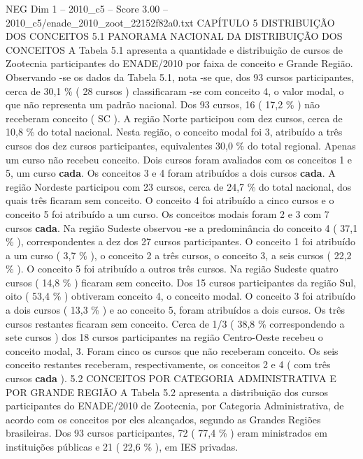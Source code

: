 \begin{textsample}{NEG Dim 1 – 2010\_c5 – Score 3.00 – 2010\_c5/enade\_2010\_zoot\_22152f82a0.txt}  \label{ex:f1_neg_306}
CAPÍTULO 5 DISTRIBUIÇÃO DOS CONCEITOS 5.1 PANORAMA NACIONAL DA DISTRIBUIÇÃO DOS CONCEITOS A Tabela 5.1 apresenta a quantidade e distribuição de cursos de Zootecnia participantes do ENADE/2010 por faixa de conceito e Grande Região.
Observando -se os dados da Tabela 5.1, nota -se que, dos 93 cursos participantes, cerca de 30,1 \% ( 28 cursos ) classificaram -se com conceito 4, o valor modal, o que não representa um padrão nacional.
Dos 93 cursos, 16 ( 17,2 \% ) não receberam conceito ( SC ).
A região Norte participou com dez cursos, cerca de 10,8 \% do total nacional.
Nesta região, o conceito modal foi 3, atribuído a três cursos dos dez cursos participantes, equivalentes 30,0 \% do total regional.
Apenas um curso não recebeu conceito.
Dois cursos foram avaliados com os conceitos 1 e 5, um curso \textbf{cada}.
Os conceitos 3 e 4 foram atribuídos a dois cursos \textbf{cada}.
A região Nordeste participou com 23 cursos, cerca de 24,7 \% do total nacional, dos quais três ficaram sem conceito.
O conceito 4 foi atribuído a cinco cursos e o conceito 5 foi atribuído a um curso.
Os conceitos modais foram 2 e 3 com 7 cursos \textbf{cada}.
Na região Sudeste observou -se a predominância do conceito 4 ( 37,1 \% ), correspondentes a dez dos 27 cursos participantes.
O conceito 1 foi atribuído a um curso ( 3,7 \% ), o conceito 2 a três cursos, o conceito 3, a seis cursos ( 22,2 \% ).
O conceito 5 foi atribuído a outros três cursos.
Na região Sudeste quatro cursos ( 14,8 \% ) ficaram sem conceito.
Dos 15 cursos participantes da região Sul, oito ( 53,4 \% ) obtiveram conceito 4, o conceito modal.
O conceito 3 foi atribuído a dois cursos ( 13,3 \% ) e ao conceito 5, foram atribuídos a dois cursos.
Os três cursos restantes ficaram sem conceito.
Cerca de 1/3 ( 38,8 \% correspondendo a sete cursos ) dos 18 cursos participantes na região Centro-Oeste recebeu o conceito modal, 3.
Foram cinco os cursos que não receberam conceito.
Os seis conceito restantes receberam, respectivamente, os conceitos 2 e 4 ( com três cursos \textbf{cada} ). 5.2 CONCEITOS POR CATEGORIA ADMINISTRATIVA E POR GRANDE REGIÃO A Tabela 5.2 apresenta a distribuição dos cursos participantes do ENADE/2010 de Zootecnia, por Categoria Administrativa, de acordo com os conceitos por eles alcançados, segundo as Grandes Regiões brasileiras.
Dos 93 cursos participantes, 72 ( 77,4 \% ) eram ministrados em instituições públicas e 21 ( 22,6 \% ), em IES privadas.

\end{textsample}
